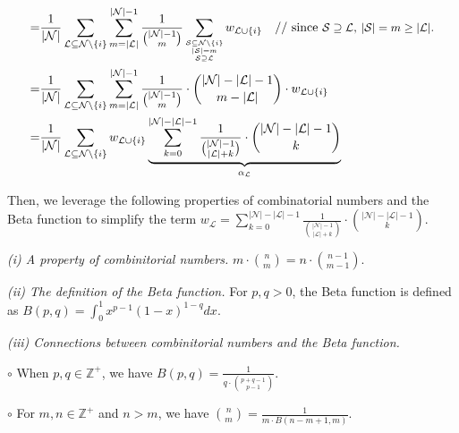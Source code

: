 \begin{small}
\begin{align*}
=& \frac{1}{|\mathcal{N}|}\sum_{\mathcal{L}\subseteq \mathcal{N}\backslash\{i\}} \sum_{m=|\mathcal{L}|}^{|\mathcal{N}|-1} \frac{1}{\binom{|\mathcal{N}|-1}{m}}\sum_{\scriptsize\substack{\mathcal{S}\subseteq \mathcal{N}\backslash\{i\}\\|\mathcal{S}|=m\\ \mathcal{S}\supseteq \mathcal{L}}} w_{\mathcal{L}\cup\{i\}}
\quad\text{// since {\small$\mathcal{S}\supseteq \mathcal{L}$}, {\small$|\mathcal{S}|=m\geq|\mathcal{L}|$}.}\\
=& \frac{1}{|\mathcal{N}|}\sum_{\mathcal{L}\subseteq \mathcal{N}\backslash\{i\}} \sum_{m=|\mathcal{L}|}^{|\mathcal{N}|-1} \frac{1}{\binom{|\mathcal{N}|-1}{m}}\cdot\binom{|\mathcal{N}|-|\mathcal{L}|-1}{m-|\mathcal{L}|}\cdot w_{\mathcal{L}\cup\{i\}}\\
=& \frac{1}{|\mathcal{N}|}\sum_{\mathcal{L}\subseteq \mathcal{N}\backslash\{i\}}w_{\mathcal{L}\cup\{i\}} \underbrace{\sum_{k=0}^{|\mathcal{N}|-|\mathcal{L}|-1}\frac{1}{\binom{|\mathcal{N}|-1}{|\mathcal{L}|+k}}\cdot\binom{|\mathcal{N}|-|\mathcal{L}|-1}{k}}_{\alpha_\mathcal{L}}
\end{align*}
\end{small}

Then, we leverage the following properties of combinatorial numbers and the Beta function to simplify the term {\small$w_\mathcal{L}=\sum_{k=0}^{|\mathcal{N}|-|\mathcal{L}|-1}\frac{1}{\binom{|\mathcal{N}|-1}{|\mathcal{L}|+k}}\cdot\binom{|\mathcal{N}|-|\mathcal{L}|-1}{k}$}.

\textit{(i) A property of combinitorial numbers.} {\small$m\cdot\binom{n}{m}=n\cdot\binom{n-1}{m-1}$.}

\textit{(ii) The definition of the Beta function.} For {\small$p,q>0$}, the Beta function is defined as {\small$B(p,q)=\int_0^1 x^{p-1}(1-x)^{1-q}dx$.}

\textit{(iii) Connections between combinitorial numbers and the Beta function.}

\quad $\circ$ When {\small$p,q\in\mathbb{Z}^+$}, we have {\small$B(p,q)=\frac{1}{q\cdot\binom{p+q-1}{p-1}}$}.

\quad $\circ$ For {\small$m,n\in\mathbb{Z}^+$} and {\small$n>m$}, we have {\small$\binom{n}{m}=\frac{1}{m\cdot B(n-m+1,m)}$}.


